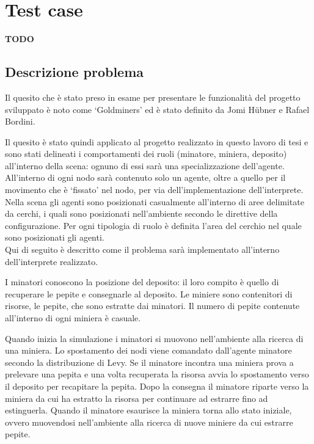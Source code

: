 \chapter{Test case}
\textbf{TODO}

\section{Descrizione problema}
Il quesito che è stato preso in esame per presentare le funzionalità del progetto sviluppato è noto come `Goldminers' ed è stato definito da Jomi H\"ubner e Rafael Bordini.

\medskip
{}
\medskip

Il quesito è stato quindi applicato al progetto realizzato in questo lavoro di tesi e sono stati delineati i comportamenti dei ruoli (minatore, miniera, deposito) all'interno della scena: ognuno di essi sarà una specializzazione dell'agente. All'interno di ogni nodo sarà contenuto solo un agente, oltre a quello per il movimento che è `fissato' nel nodo, per via dell'implementazione dell'interprete.
\\
Nella scena gli agenti sono posizionati casualmente all'interno di aree delimitate da cerchi, i quali sono posizionati nell'ambiente secondo le direttive della configurazione. Per ogni tipologia di ruolo è definita l'area del cerchio nel quale sono posizionati gli agenti.
\\
Qui di seguito è descritto come il problema sarà implementato all'interno dell'interprete realizzato.

I minatori conoscono la posizione del deposito: il loro compito è quello di recuperare le pepite e consegnarle al deposito.
Le miniere sono contenitori di risorse, le pepite, che sono estratte dai minatori. Il numero di pepite contenute all'interno di ogni miniera è casuale.

Quando inizia la simulazione i minatori si muovono nell'ambiente alla ricerca di una miniera. Lo spostamento dei nodi viene comandato dall'agente minatore secondo la distribuzione di Levy.
Se il minatore incontra una miniera prova a prelevare una pepita e una volta recuperata la risorsa avvia lo spostamento verso il deposito per recapitare la pepita. Dopo la consegna il minatore riparte verso la miniera da cui ha estratto la risorsa per continuare ad estrarre fino ad estinguerla.
Quando il minatore esaurisce la miniera torna allo stato iniziale, ovvero muovendosi nell'ambiente alla ricerca di nuove miniere da cui estrarre pepite.


